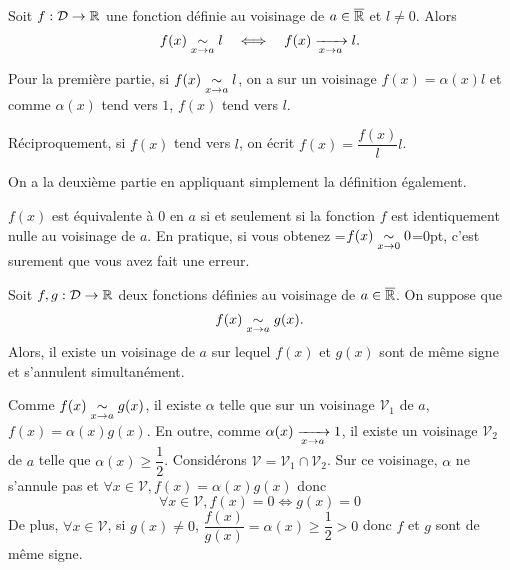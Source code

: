 \documentclass{magnoliaold}
\begin{document}

\begin{proposition}[utile=-3]
Soit $f:\mathcal{D}\to\mathbb{R}$ une fonction définie au voisinage de $a\in\overline{\mathbb{R}}$ et $l\neq 0$. Alors
\[f(x)\underset{x\rightarrow a}{\sim}l \quad\Longleftrightarrow\quad f(x)\xrightarrow[x\rightarrow a]{}l.\]
\end{proposition}

\begin{preuve}
Pour la première partie, si $\displaystyle f(x)\underset{x\rightarrow a}{\sim}l$, on a sur un voisinage $f(x)=\alpha(x)l$ et comme $\alpha(x)$ tend vers $1$, $f(x)$ tend vers $l$.

Réciproquement, si $f(x)$ tend vers $l$, on écrit $f(x)=\dfrac{f(x)}{l}l$.

On a la deuxième partie en appliquant simplement la définition également.

\end{preuve}

\begin{remarqueUnique}
\remarque $f(x)$ est équivalente à 0 en $a$ si et seulement si la fonction $f$ est identiquement nulle au voisinage de $a$. En pratique, si vous obtenez 
  =\hbox{$f(x)\underset{x\rightarrow 0}{\sim}0$}=0pt,
  c'est surement que vous avez fait une erreur.
\end{remarqueUnique}

\begin{proposition}[utile=-3]
Soit $f,g:\mathcal{D}\to\mathbb{R}$ deux fonctions définies au voisinage de $a\in\overline{\mathbb{R}}$. On suppose
que
\[f(x)\underset{x\rightarrow a}{\sim} g(x).\]
Alors, il existe un voisinage de $a$ sur lequel $f(x)$ et $g(x)$ sont de
même signe et s'annulent simultanément.  
\end{proposition}

\begin{preuve}
Comme $\displaystyle f(x)\underset{x\rightarrow a}{\sim} g(x)$, il existe $\alpha$ telle que sur un voisinage $\mathcal{V}_1$ de $a$, $f(x)=\alpha(x)g(x)$. En outre, comme $\alpha(x)\xrightarrow[x\rightarrow a]{}1$, il existe un voisinage $\mathcal{V}_2$ de $a$ telle que $\alpha(x)\geq \dfrac{1}{2}$. Considérons $\mathcal{V}=\mathcal{V}_1\cap\mathcal{V}_2$. Sur ce voisinage, $\alpha$ ne s'annule pas et $\forall x \in \mathcal{V}, f(x)=\alpha(x)g(x)$ donc \[\forall x\in \mathcal{V}, f(x)=0\Longleftrightarrow g(x)=0\]
De plus, $\forall x\in \mathcal{V}$, si $g(x)\neq0$, $\dfrac{f(x)}{g(x)}=\alpha(x)\geq \dfrac{1}{2}>0$ donc $f$ et $g$ sont de même signe.
\end{preuve}
\end{document}
